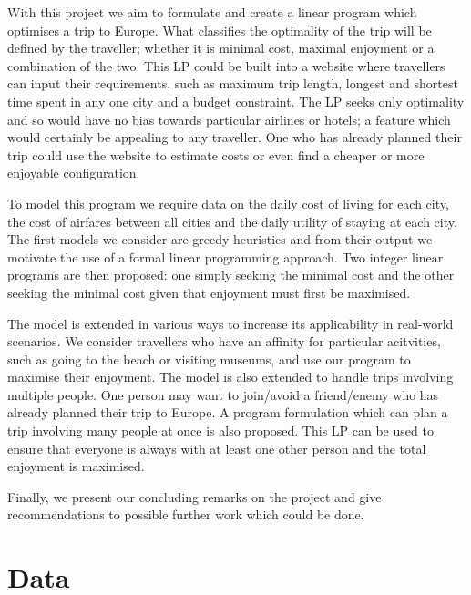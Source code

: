 \documentclass[12pt]{article}
\begin{document}
With this project we aim to formulate and create a linear program which optimises a trip to Europe. What classifies the optimality of the trip will be defined by the traveller; whether it is minimal cost, maximal enjoyment or a combination of the two. This LP could be built into a website where travellers can input their requirements, such as maximum trip length, longest and shortest time spent in any one city and a budget constraint. The LP seeks only optimality and so would have no bias towards particular airlines or hotels; a feature which would certainly be appealing to any traveller. One who has already planned their trip could use the website to estimate costs or even find a cheaper or more enjoyable configuration.

To model this program we require data on the daily cost of living for each city, the cost of airfares between all cities and the daily utility of staying at each city. The first models we consider are greedy heuristics and from their output we motivate the use of a formal linear programming approach. Two integer linear programs are then proposed: one simply seeking the minimal cost and the other seeking the minimal cost given that enjoyment must first be maximised.

The model is extended in various ways to increase its applicability in real-world scenarios. We consider travellers who have an affinity for particular acitvities, such as going to the beach or visiting museums, and use our program to maximise their enjoyment. The model is also extended to handle trips involving multiple people. One person may want to join/avoid a friend/enemy who has already planned their trip to Europe. A program formulation which can plan a trip involving many people at once is also proposed. This LP can be used to ensure that everyone is always with at least one other person and the total enjoyment is maximised.

Finally, we present our concluding remarks on the project and give recommendations to possible further work which could be done.



\pagebreak
\section{Data} 
\label{sec:data}
\end{document}
